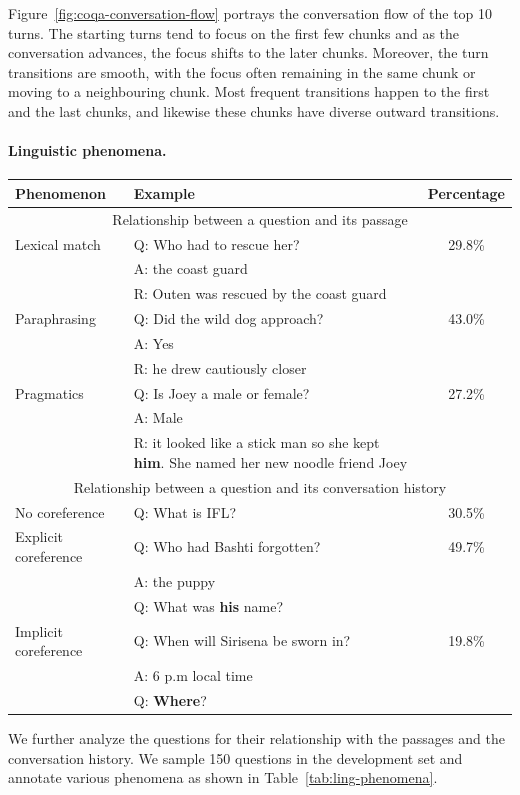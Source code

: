 Figure~\ref{fig:coqa-conversation-flow} portrays the conversation flow of the top 10 turns.
The starting turns tend to focus on the first few chunks and as the conversation advances, the focus shifts to the later chunks. Moreover, the turn transitions are smooth, with the focus often remaining in the same chunk or moving to a neighbouring chunk. Most frequent transitions happen to the first and the last chunks, and likewise these chunks have diverse outward transitions.

\paragraph{Linguistic phenomena.}

\begin{table}[!t]
\centering
\small
\begin{tabular}{lp{7cm}c}
\toprule
\bf Phenomenon & \bf Example & \bf Percentage \\
\midrule
\multicolumn{3}{c}{Relationship between a question and its passage} \\
\midrule
Lexical match & Q: Who had to rescue her?& 29.8\% \\
& A: the coast guard \\
& R: Outen was rescued by the coast guard \\
Paraphrasing & Q: Did the wild dog approach? & 43.0\% \\
& A: Yes \\
& R: he drew cautiously closer \\
Pragmatics &  Q:               Is Joey a male or female?  &  27.2\% \\
 & A:  Male \\
& R: it looked like a stick man so she kept \textbf{him}. She named her new noodle friend Joey \\
\midrule
\multicolumn{3}{c}{Relationship between a question and its conversation history} \\
\midrule
No coreference & Q: What is IFL? & 30.5\% \\
Explicit coreference & Q: Who had Bashti forgotten? & 49.7\% \\
& A: the puppy \\
& Q: What was \textbf{his} name? \\
Implicit coreference & Q: When will Sirisena be sworn in? & 19.8\% \\
& A: 6 p.m local time  \\
& Q: \textbf{Where}?\\
\bottomrule
\end{tabular}
\end{table}
We further analyze the questions for their relationship with the passages and the conversation history. We sample 150 questions in the development set and annotate various phenomena as shown in Table~\ref{tab:ling-phenomena}.

